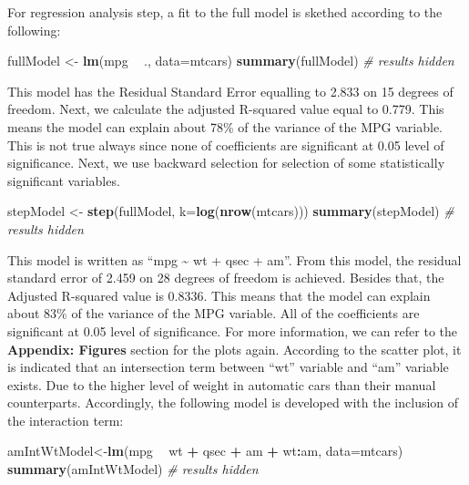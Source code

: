 \documentclass[]{article}
\newenvironment{Shaded}{\begin{snugshade}}{\end{snugshade}}
\newcommand{\KeywordTok}[1]{\textcolor[rgb]{0.13,0.29,0.53}{\textbf{#1}}}
\newcommand{\DataTypeTok}[1]{\textcolor[rgb]{0.13,0.29,0.53}{#1}}
\newcommand{\StringTok}[1]{\textcolor[rgb]{0.31,0.60,0.02}{#1}}
\newcommand{\CommentTok}[1]{\textcolor[rgb]{0.56,0.35,0.01}{\textit{#1}}}
\newcommand{\OperatorTok}[1]{\textcolor[rgb]{0.81,0.36,0.00}{\textbf{#1}}}
\newcommand{\NormalTok}[1]{#1}
\begin{document}
For regression analysis step, a fit to the full model is skethed
according to the following:

\begin{Shaded}
\begin{Highlighting}[]
\NormalTok{fullModel <-}\StringTok{ }\KeywordTok{lm}\NormalTok{(mpg }\OperatorTok{~}\StringTok{ }\NormalTok{., }\DataTypeTok{data=}\NormalTok{mtcars)}
\KeywordTok{summary}\NormalTok{(fullModel) }\CommentTok{# results hidden}
\end{Highlighting}
\end{Shaded}

This model has the Residual Standard Error equalling to 2.833 on 15
degrees of freedom. Next, we calculate the adjusted R-squared value
equal to 0.779. This means the model can explain about 78\% of the
variance of the MPG variable. This is not true always since none of
coefficients are significant at 0.05 level of significance. Next, we use
backward selection for selection of some statistically significant
variables.

\begin{Shaded}
\begin{Highlighting}[]
\NormalTok{stepModel <-}\StringTok{ }\KeywordTok{step}\NormalTok{(fullModel, }\DataTypeTok{k=}\KeywordTok{log}\NormalTok{(}\KeywordTok{nrow}\NormalTok{(mtcars)))}
\KeywordTok{summary}\NormalTok{(stepModel) }\CommentTok{# results hidden}
\end{Highlighting}
\end{Shaded}

This model is written as ``mpg \textasciitilde{} wt + qsec + am''. From
this model, the residual standard error of 2.459 on 28 degrees of
freedom is achieved. Besides that, the Adjusted R-squared value is
0.8336. This means that the model can explain about 83\% of the variance
of the MPG variable. All of the coefficients are significant at 0.05
level of significance. For more information, we can refer to the
\textbf{Appendix: Figures} section for the plots again. According to the
scatter plot, it is indicated that an intersection term between ``wt''
variable and ``am'' variable exists. Due to the higher level of weight
in automatic cars than their manual counterparts. Accordingly, the
following model is developed with the inclusion of the interaction term:

\begin{Shaded}
\begin{Highlighting}[]
\NormalTok{amIntWtModel<-}\KeywordTok{lm}\NormalTok{(mpg }\OperatorTok{~}\StringTok{ }\NormalTok{wt }\OperatorTok{+}\StringTok{ }\NormalTok{qsec }\OperatorTok{+}\StringTok{ }\NormalTok{am }\OperatorTok{+}\StringTok{ }\NormalTok{wt}\OperatorTok{:}\NormalTok{am, }\DataTypeTok{data=}\NormalTok{mtcars)}
\KeywordTok{summary}\NormalTok{(amIntWtModel) }\CommentTok{# results hidden}
\end{Highlighting}
\end{Shaded}
\end{document}
